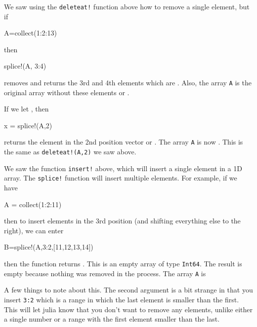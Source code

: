 \begin{description}[font=\sffamily\bfseries]
\item[Removing elements from an array]  We saw using the \verb|deleteat!| function above how to remove a single element, but if
\begin{jlblock}[array]
A=collect(1:2:13)
\end{jlblock}
then 
%
\begin{jlblock}[array]
splice!(A, 3:4)
\end{jlblock}
%
removes and returns the 3rd and 4th elements which are \printpythontex[verb]. Also, the array
\texttt{A} is the original array without these elements or  \printpythontex[verb]. 

If we let , then

\begin{jlblock}[array]
x = splice!(A,2)
\end{jlblock}
returns the element in the 2nd position vector or  \printpythontex[verbatim]. The array \texttt{A} is now  \printpythontex[verbatim].  This is the same as \verb|deleteat!(A,2)| we saw above.  

\item[Inserting elements from an array]  We saw the function \verb|insert!| above, which will insert a single element in a 1D array. The \verb|splice!| function will insert multiple elements.  For example, if we have 
\begin{jlblock}[array]
A = collect(1:2:11)
\end{jlblock}
%
then to insert elements in the 3rd position (and shifting everything else to the right), we can enter
\begin{jlblock}[array]
B=splice!(A,3:2,[11,12,13,14])
\end{jlblock}
then the function returns  \printpythontex[verb].  This is an empty array of type \verb!Int64!.  The result is empty because nothing was removed in the process.  The array \verb!A! is \printpythontex[verbatim] 

A few things to note about this.  The second argument is a bit strange in that you insert \verb!3:2! which is a range in which the last element is smaller than the first. This will let julia know that you don't want to remove any elements, unlike either a single number or a range with the first element smaller than the last. 





\end{description}
